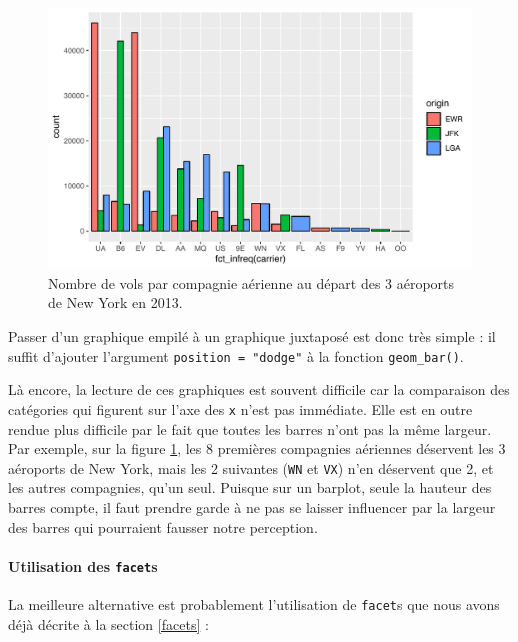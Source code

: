 \documentclass[a4paperpaper,]{article}
\let\oldparagraph\paragraph
\renewcommand{\paragraph}[1]{\oldparagraph{#1}\mbox{}}
\begin{document}
\begin{figure}[htpb]

{\centering \includegraphics[width=0.9\linewidth]{figure/dodge-1} 

}

\caption{Nombre de vols par compagnie aérienne au départ des 3 aéroports de New York en 2013.}\label{fig:dodge}
\end{figure}

Passer d'un graphique empilé à un graphique juxtaposé est donc très simple : il suffit d'ajouter l'argument \texttt{position\ =\ "dodge"} à la fonction \texttt{geom\_bar()}.

Là encore, la lecture de ces graphiques est souvent difficile car la comparaison des catégories qui figurent sur l'axe des \texttt{x} n'est pas immédiate. Elle est en outre rendue plus difficile par le fait que toutes les barres n'ont pas la même largeur. Par exemple, sur la figure \ref{fig:dodge}, les 8 premières compagnies aériennes déservent les 3 aéroports de New York, mais les 2 suivantes (\texttt{WN} et \texttt{VX}) n'en déservent que 2, et les autres compagnies, qu'un seul. Puisque sur un barplot, seule la hauteur des barres compte, il faut prendre garde à ne pas se laisser influencer par la largeur des barres qui pourraient fausser notre perception.

\hypertarget{utilisation-des-facets}{%
\paragraph{\texorpdfstring{Utilisation des \texttt{facet}s}{Utilisation des facets}}\label{utilisation-des-facets}}

La meilleure alternative est probablement l'utilisation de \texttt{facet}s que nous avons déjà décrite à la section \ref{facets} :
\end{document}
